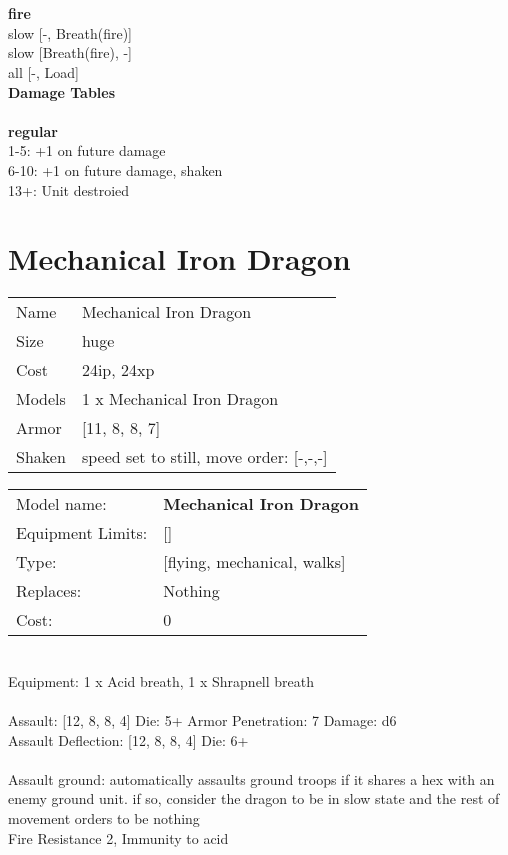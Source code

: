  
\ \\



\ \\ {\bf fire } \\
slow [-, Breath(fire)] \\
slow [Breath(fire), -] \\
all [-, Load] \\


{\bf Damage Tables} \\
\ \\ {\bf regular } \\
1-5: +1 on future damage \\
6-10: +1 on future damage, shaken \\
13+: Unit destroied \\










\pagebreak\pagebreak

\section{ Mechanical Iron Dragon }

\begin{tabular}{ll}
  Name & Mechanical Iron Dragon \\
  Size & huge\\
  Cost & 24ip, 24xp\\
  Models & 1 x Mechanical Iron Dragon\\
  Armor & [11, 8, 8, 7]\\
  Shaken & speed set to still, move order: [-,-,-]\\
\end{tabular}

\noindent 

\noindent
\begin{tabular}{ll}
Model name: &{\bf Mechanical Iron Dragon } \\
Equipment Limits: &[] \\
Type: &[flying, mechanical, walks] \\
Replaces: &Nothing \\
Cost: & 0\\
\end{tabular}
\ \\
Equipment: 1 x Acid breath, 1 x Shrapnell breath \\
\ \\
Assault: [12, 8, 8, 4] Die: 5+ Armor Penetration: 7 Damage: d6 \\
Assault Deflection: [12, 8, 8, 4] Die: 6+\\
\indent  
\ \\
Assault ground: automatically assaults ground troops if it shares a hex with an enemy ground unit. if so, consider the dragon to be in slow state and the rest of movement orders to be nothing\\ 
Fire Resistance 2, Immunity to acid\\ 

